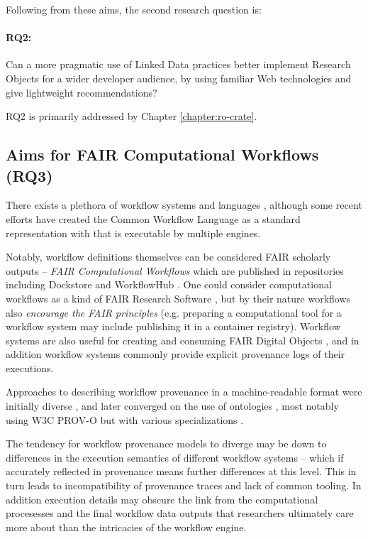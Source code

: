 Following from these aims, the second research question is: 

\paragraph{RQ2:}\label{rq2}  Can a more pragmatic use of Linked Data practices better implement Research Objects for a wider developer audience, by using familiar Web technologies and give lightweight recommendations?

RQ2 is primarily addressed by Chapter \ref{chapter:ro-crate}.


\subsection{Aims for FAIR Computational Workflows (RQ3)}
\label{intro:rq3}

There exists a plethora of \gls{workflow} systems and languages \cite{Leipzig 2021,Amstutz 2021}, although some recent efforts have created the Common Workflow Language \cite{Crusoe 2022} as a standard representation with  that is executable by multiple engines. 

Notably, workflow definitions themselves can be considered FAIR scholarly outputs \cite{Goble 2020} -- \emph{FAIR Computational Workflows} which are published in repositories including Dockstore \cite{Yuen 2021} and WorkflowHub \cite{Goble 2021}.
One could consider computational workflows as a kind of FAIR Research Software \cite{de Visser 2023}, but by their nature workflows also \emph{encourage the FAIR principles} (e.g. preparing a computational tool for a workflow system \cite{Brack 2022a} may include publishing it in a container registry). Workflow systems are also useful for creating and consuming FAIR Digital Objects \cite{Wittenburg 2022b}, and in addition workflow systems commonly provide explicit provenance logs of their executions.

Approaches to describing workflow provenance in a machine-readable format were initially diverse \cite{Cruz 2009}, and later converged on the use of ontologies \cite{Missier 2010}, most notably using W3C PROV-O \cite{Lebo 2013a} but with various specializations \cite{Garijo 2011,Garijo 2012,Missier 2013,Belhajjame 2015,Cuevas-Vicenttín 2016}. 

The tendency for workflow provenance models to diverge may be down to differences in the execution semantics of different workflow systems -- which if accurately reflected in provenance means further differences at this level. This in turn leads to incompatibility of provenance traces and lack of common tooling. In addition execution details may obscure the link from the computational procesesses and the final workflow data outputs that researchers ultimately care more about than the intricacies of the workflow engine.

